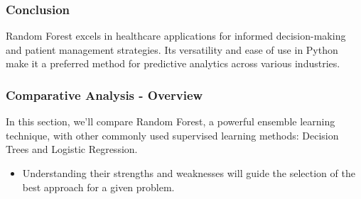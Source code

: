 \documentclass[aspectratio=169]{beamer}
\begin{document}
\begin{frame}
    \frametitle{Conclusion}
    Random Forest excels in healthcare applications for informed decision-making and patient management strategies. Its versatility and ease of use in Python make it a preferred method for predictive analytics across various industries.
\end{frame}

\begin{frame}[fragile]
    \frametitle{Comparative Analysis - Overview}
    In this section, we’ll compare Random Forest, a powerful ensemble learning technique, with other commonly used supervised learning methods: Decision Trees and Logistic Regression. 
    \begin{itemize}
        \item Understanding their strengths and weaknesses will guide the selection of the best approach for a given problem.
    \end{itemize}
\end{frame}
\end{document}
